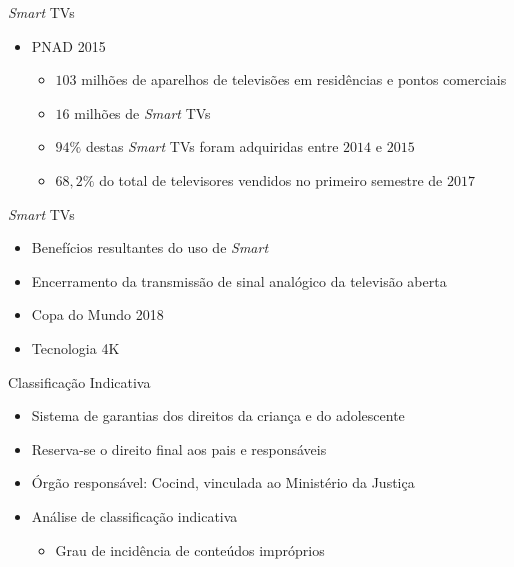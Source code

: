 \begin{frame}{\emph{Smart} TVs}
   \ \  \\[0.1cm]
  \begin{itemize}
  \item PNAD 2015
  \begin{itemize}
    \item $103$ milhões de aparelhos de televisões em residências e pontos comerciais
    \item $16$ milhões de \emph{Smart} TVs
    \item $94\%$ destas \emph{Smart} TVs foram adquiridas entre $2014$ e $2015$
    \item $68,2\%$ do total de televisores vendidos no primeiro semestre de $2017$
  \end{itemize}
\end{itemize}
\end{frame}

\begin{frame}{\emph{Smart} TVs}
   \ \  \\[0.1cm]
  \begin{itemize}
  \item Benefícios resultantes do uso de \emph{Smart}

  \item Encerramento da transmissão de sinal analógico da televisão aberta
  \item Copa do Mundo 2018
  \item Tecnologia 4K
\end{itemize}
\end{frame}

\begin{frame}{Classificação Indicativa}
   \ \  \\[0.1cm]
  \begin{itemize}
  \item Sistema de garantias dos direitos da criança e do adolescente
  \item Reserva-se o direito final aos pais e responsáveis
  \item Órgão responsável: Cocind, vinculada ao Ministério da Justiça
  \item Análise de classificação indicativa
  \begin{itemize}
    \item Grau de incidência de conteúdos impróprios
  \end{itemize}
\end{itemize}
\end{frame}

